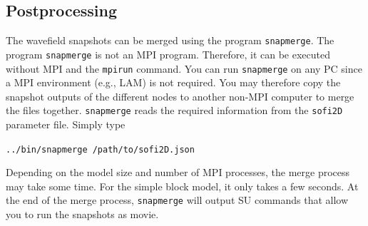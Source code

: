 

\subsection{Postprocessing}
The wavefield snapshots can be merged using the program \texttt{snapmerge}. The program \texttt{snapmerge} is not an MPI program. Therefore, it can be executed without MPI and the \texttt{mpirun} command. You can run \texttt{snapmerge} on any PC since a MPI environment (e.g., LAM) is not required. You may therefore copy the snapshot outputs of the different nodes to another non-MPI computer to merge the files together. \texttt{snapmerge} reads the required information from the \texttt{sofi2D} parameter file. Simply type

\texttt{../bin/snapmerge /path/to/sofi2D.json}

Depending on the model size and number of MPI processes, the merge process may take some time. For the simple block model, it only takes a few seconds. At the end of the merge process, \texttt{snapmerge} will output SU commands that allow you to run the snapshots as movie.


